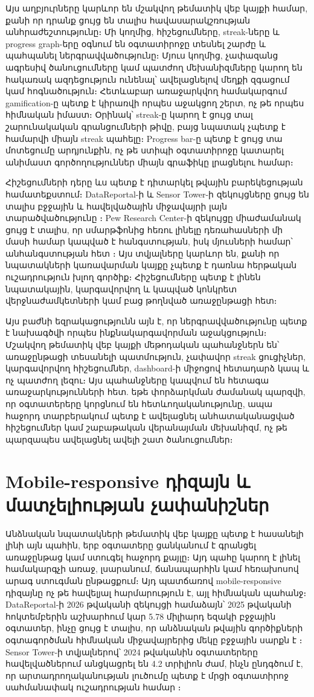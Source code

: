 Այս աղբյուրները կարևոր են մշակվող թեմատիկ վեբ կայքի համար, քանի որ դրանք ցույց են տալիս հավասարակշռության անհրաժեշտությունը։ Մի կողմից, հիշեցումները, streak-ները և progress graph-երը օգնում են օգտատիրոջը տեսնել շարժը և պահպանել ներգրավվածությունը։ Մյուս կողմից, չափազանց ագրեսիվ ծանուցումները կամ պատժող մեխանիզմները կարող են հակառակ ազդեցություն ունենալ՝ ավելացնելով մեղքի զգացում կամ հոգնածություն։ Հետևաբար առաջարկվող համակարգում gamification-ը պետք է կիրառվի որպես աջակցող շերտ, ոչ թե որպես հիմնական իմաստ։ Օրինակ՝ streak-ը կարող է ցույց տալ շարունակական գրանցումների թիվը, բայց նպատակ չպետք է համարվի միայն streak պահելը։ Progress bar-ը պետք է ցույց տա մոտեցումը արդյունքին, ոչ թե ստիպի օգտատիրոջը կատարել անիմաստ գործողություններ միայն գրաֆիկը լրացնելու համար։

Հիշեցումների դերը ևս պետք է դիտարկել թվային բարեկեցության համատեքստում։ DataReportal-ի և Sensor Tower-ի զեկույցները ցույց են տալիս բջջային և հավելվածային միջավայրի լայն տարածվածությունը \autocite{datareportal2026,sensortower2025}։ Pew Research Center-ի զեկույցը միաժամանակ ցույց է տալիս, որ սմարթֆոնից հեռու լինելը դեռահասների մի մասի համար կապված է հանգստության, իսկ մյուսների համար՝ անհանգստության հետ \autocite{pew2024screens}։ Այս տվյալները կարևոր են, քանի որ նպատակների կառավարման կայքը չպետք է դառնա հերթական ուշադրություն խլող գործիք։ Հիշեցումները պետք է լինեն նպատակային, կարգավորվող և կապված կոնկրետ վերջնաժամկետների կամ բաց թողնված առաջընթացի հետ։

Այս բաժնի եզրակացությունն այն է, որ ներգրավվածությունը պետք է նախագծվի որպես ինքնակարգավորման աջակցություն։ Մշակվող թեմատիկ վեբ կայքի մեթոդական պահանջներն են՝ առաջընթացի տեսանելի պատմություն, չափավոր streak ցուցիչներ, կարգավորվող հիշեցումներ, dashboard-ի միջոցով հետադարձ կապ և ոչ պատժող լեզու։ Այս պահանջները կապվում են հետագա առաջարկությունների հետ. եթե փորձարկման ժամանակ պարզվի, որ օգտատերերը կորցնում են հետևողականությունը, ապա հաջորդ տարբերակում պետք է ավելացնել անհատականացված հիշեցումներ կամ շաբաթական վերանայման մեխանիզմ, ոչ թե պարզապես ավելացնել ավելի շատ ծանուցումներ։

\section{Mobile-responsive դիզայն և մատչելիության չափանիշներ}

Անձնական նպատակների թեմատիկ վեբ կայքը պետք է հասանելի լինի այն պահին, երբ օգտատերը ցանկանում է գրանցել առաջընթաց կամ ստուգել հաջորդ քայլը։ Այդ պահը կարող է լինել համակարգչի առաջ, լսարանում, ճանապարհին կամ հեռախոսով արագ ստուգման ընթացքում։ Այդ պատճառով mobile-responsive դիզայնը ոչ թե հավելյալ հարմարություն է, այլ հիմնական պահանջ։ DataReportal-ի 2026 թվականի զեկույցի համաձայն՝ 2025 թվականի հոկտեմբերին աշխարհում կար 5.78 միլիարդ եզակի բջջային օգտատեր, ինչը ցույց է տալիս, որ անձնական թվային գործիքների օգտագործման հիմնական միջավայրերից մեկը բջջային սարքն է \autocite{datareportal2026}։ Sensor Tower-ի տվյալներով՝ 2024 թվականին օգտատերերը հավելվածներում անցկացրել են 4.2 տրիլիոն ժամ, ինչն ընդգծում է, որ արտադրողականության լուծումը պետք է մրցի օգտատիրոջ սահմանափակ ուշադրության համար \autocite{sensortower2025}։

